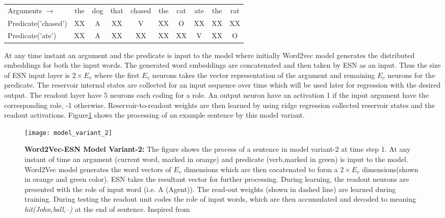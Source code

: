 \begin{table}[!htb]
\centering
\label{tab:argument-predicate}
\begin{tabular}{lccccccccc}
Arguments $\rightarrow$ & the & dog & that & chased & the & cat & ate & the & rat \\
Predicate('chased') 	 & XX  & A   & XX   & V      & XX  & O   & XX  & XX  & XX  \\
Predicate('ate')    	 & XX  & A   & XX   & XX     & XX  & XX  & V   & XX  & O  
\end{tabular}
\end{table}

At any time instant an argument and the predicate is input to the model where initially Word2vec model generates the distributed embeddings for both the input words. The generated word embeddings are concatenated and then taken by ESN as an input. Thus the size of ESN input layer is $2 \times E_{v}$ where the first $E_{v}$ neurons takes the vector representation of the argument and remaining $E_{v}$ neurons for the predicate. The reservoir internal states are collected for an input sequence over time which will be used later for regression with the desired output. The readout layer have 5 neurons each coding for a role. An output neuron have an activation 1 if the input argument have the corresponding role, -1 otherwise. Reservoir-to-readout weights are then learned by using ridge regression collected reservoir states and the readout activations. Figure\ref{fig:model_variant_2} shows the processing of an example sentence by this model variant.

\begin{figure}[hbtp]
\centering
\texttt{[image: model\_variant\_2]}
\caption{\textbf{Word2Vec-ESN Model Variant-2:} 
The figure shows the process of a sentence in model variant-2 at time step 1. At any instant of time an argument (current word, marked in orange) and predicate (verb,marked in green) is input to the model. Word2Vec model generates the word vectors of $E_{v}$ dimensions which are then cocatenated to form a $2 \times E_{v}$ dimensions(shown in orange and green color). ESN takes the resultant vector for further processing. During learning, the readout neurons are presented with the role of input word (i.e. A (Agent)). The read-out weights (shown in dashed line) are learned during training. During testing the readout unit codes the role of input words, which are then accumulated and decoded to meaning \textit{hit(John,ball,--)} at the end of sentence. Inspired from \cite{xavier:2013:RT}
}
\label{fig:model_variant_2}
\end{figure}

